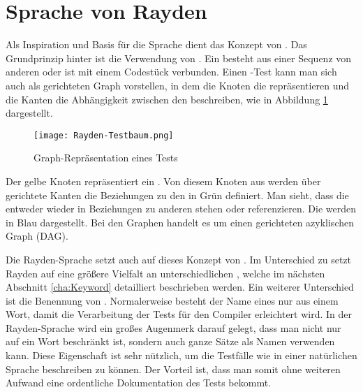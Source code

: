 
\section{Sprache von Rayden}

Als Inspiration und Basis für die Sprache dient das Konzept von . Das Grundprinzip hinter  ist die Verwendung von . Ein  besteht aus einer Sequenz von anderen  oder ist mit einem Codestück verbunden. Einen -Test kann man sich auch als gerichteten Graph vorstellen, in dem die Knoten die  repräsentieren und die Kanten die Abhängigkeit zwischen den  beschreiben, wie in Abbildung \ref{fig:test-graph} dargestellt.

\begin{figure}[h]
\centering
\texttt{[image: Rayden-Testbaum.png]}
\caption{Graph-Repräsentation eines Tests}
\label{fig:test-graph}
\end{figure}

\SuperPar
Der gelbe Knoten repräsentiert ein . Von diesem Knoten aus werden über gerichtete Kanten die Beziehungen zu den  in Grün definiert. Man sieht, dass die  entweder wieder in Beziehungen zu anderen  stehen oder  referenzieren. Die  werden in Blau dargestellt. Bei den Graphen handelt es um einen gerichteten azyklischen Graph (DAG).

\SuperPar
Die Rayden-Sprache setzt auch auf dieses Konzept von . Im Unterschied zu  setzt Rayden auf eine größere Vielfalt an unterschiedlichen , welche im nächsten Abschnitt \ref{cha:Keyword} detailliert beschrieben werden. Ein weiterer Unterschied ist die Benennung von . Normalerweise besteht der Name eines  nur aus einem Wort, damit die Verarbeitung der Tests für den Compiler erleichtert wird. In der Rayden-Sprache wird ein großes Augenmerk darauf gelegt, dass man nicht nur auf ein Wort beschränkt ist, sondern auch ganze Sätze als Namen verwenden kann. Diese Eigenschaft ist sehr nützlich, um die Testfälle wie in einer natürlichen Sprache beschreiben zu können. Der Vorteil ist, dass man somit ohne weiteren Aufwand eine ordentliche Dokumentation des Tests bekommt.

